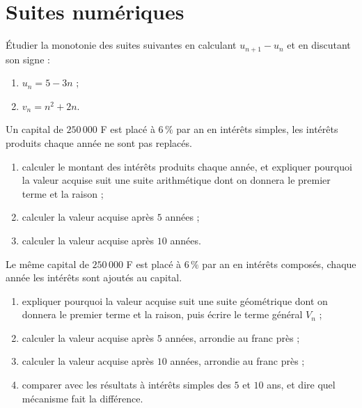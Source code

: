 \clearpage
\chapter{Suites numériques}

\begin{exercice}
Étudier la monotonie des suites suivantes en calculant $u_{n+1} - u_{n}$ et en discutant son signe :
\begin{enumerate}
\item $u_{n} = 5 - 3n$ ;
\item $v_{n} = n^{2} + 2n$.
\end{enumerate}
\end{exercice}

\begin{exercice}
Un capital de $250\,000$ F est placé à $6\,\%$ par an en intérêts simples, les intérêts produits chaque année ne sont pas replacés.
\begin{enumerate}
\item calculer le montant des intérêts produits chaque année, et expliquer pourquoi la valeur acquise suit une suite arithmétique dont on donnera le premier terme et la raison ;
\item calculer la valeur acquise après $5$ années ;
\item calculer la valeur acquise après $10$ années.
\end{enumerate}
\end{exercice}

\begin{exercice}
Le même capital de $250\,000$ F est placé à $6\,\%$ par an en intérêts composés, chaque année les intérêts sont ajoutés au capital.
\begin{enumerate}
\item expliquer pourquoi la valeur acquise suit une suite géométrique dont on donnera le premier terme et la raison, puis écrire le terme général $V_{n}$ ;
\item calculer la valeur acquise après $5$ années, arrondie au franc près ;
\item calculer la valeur acquise après $10$ années, arrondie au franc près ;
\item comparer avec les résultats à intérêts simples des $5$ et $10$ ans, et dire quel mécanisme fait la différence.
\end{enumerate}
\end{exercice}

